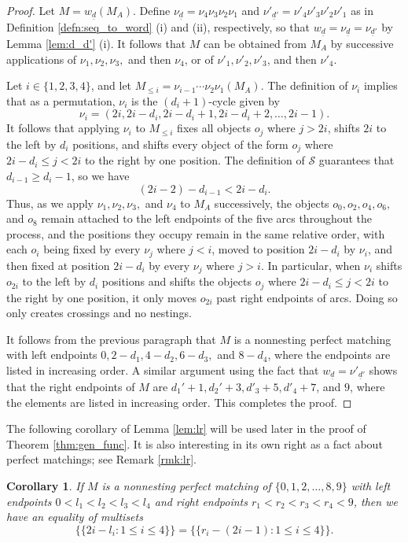 \documentclass[11pt]{amsart}
\theoremstyle{plain}
\newtheorem{cor}[theorem]{Corollary}
\theoremstyle{definition}
\theoremstyle{remark}
\numberwithin{equation}{section}
\newcommand{\mset}[1]{\{\!\{#1\}\!\}}
\newcommand{\seqd}{\underline{d}}
\newcommand{\cals}{\mathcal{S}}
\begin{document}
\begin{proof}
  Let $M=w_{\seqd}(M_A)$. Define $\nu_{\seqd}=\nu_4\nu_3\nu_2\nu_1$ and
  $\nu'_{\seqd'}=\nu'_4\nu'_3\nu'_2\nu'_1$ as in Definition
  \ref{defn:seq_to_word} (i) and (ii), respectively, so that
  $w_{\seqd}=\nu_{\seqd}=\nu_{\seqd'}$ by Lemma \ref{lem:d_d'} (i). It follows
  that $M$ can be obtained from $M_A$ by successive applications of $\nu_1,
  \nu_2, \nu_3,$ and then $\nu_4$, or of $\nu'_1, \nu'_2, \nu'_3$, and then
  $\nu'_4$.

Let $i\in \{1,2,3,4\}$, and let $M_{\le i}=\nu_{i-1}\cdots\nu_2\nu_1(M_A)$. The
definition of $\nu_i$ implies that as a permutation, $\nu_i$ is the $(d_i+1)$-cycle given by 
\[
  \nu_i=(2i,
2i-d_i, 2i-d_i+1, 2i-d_i+2, \dots, 2i-1).
\]
It follows that applying $\nu_i$ to $M_{\le i}$ fixes all
objects $o_j$ where $j>2i$, shifts $2i$ to the left by $d_i$ positions, and
shifts every object of the form $o_j$ where $2i-d_i\le j<2i$ to the right by one
position. The definition of $\cals$ guarantees that $d_{i-1}\ge d_i-1$, so we
have 
\[
  (2i-2)-d_{i-1}< 2i-d_i.
\]
Thus, as we apply $\nu_1, \nu_2,\nu_3,$ and $\nu_4$ to $M_A$
successively, the objects $o_{0}, o_{2}, o_4, o_6,$ and $o_8$ remain attached to
the left endpoints of the five arcs throughout the process, and the positions
they occupy remain in the same relative order, with each $o_i$ being fixed by
every $\nu_j$ where $j<i$, moved to position $2i-d_i$ by $\nu_i$, and then fixed
at position $2i-d_i$ by every $\nu_j$ where $j>i$. In particular, when $\nu_i$
shifts $o_{2i}$ to the left by $d_i$ positions and shifts the objects $o_j$
where $2i-d_{i}\le j<2i$ to the right by one position, it only moves $o_{2i}$
past right endpoints of arcs. Doing so only creates crossings and no nestings. 

It follows from the previous paragraph that $M$ is a nonnesting perfect matching
with left endpoints $0,2-d_1, 4-d_2, 6-d_3,$ and $8-d_4$, where the endpoints
are listed in increasing order. A similar argument using the fact that
$w_{\seqd}=\nu'_{\seqd'}$ shows that the right endpoints of $M$ are $d_1'+1,
d_2'+3,d'_3+5, d'_4+7$, and $9$, where the elements are listed in increasing
order. This completes the proof.
\end{proof}

The following corollary of Lemma \ref{lem:lr} will be used later in the proof of
Theorem \ref{thm:gen_func}. It is also interesting in its own right as a
fact about perfect matchings; see Remark \ref{rmk:lr}. 

\begin{cor}
\label{cor:lr}
If $M$ is a nonnesting perfect matching of $\{0,1,2,\dots,8,9\}$ with left endpoints $0<l_1<l_2<l_3<l_4$
  and right endpoints $r_1<r_2<r_3<r_4<9$, then we have an equality of multisets
  \begin{equation}
    \label{eq:lr}
    \mset{2i-l_i: 1\le i\le 4} = \mset{r_i-(2i-1): 1\le i\le 4}.
  \end{equation}
\end{cor}
\end{document}
